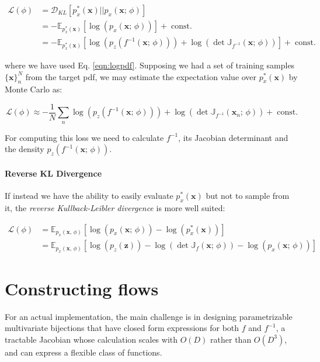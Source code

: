 \[
\begin{aligned}
    \mathcal{L}(\phi) &= \mathcal{D}_{KL}[p_x^*(\mathbf{x})||p_x(\mathbf{x}; \, \phi)]\\
    &= -\mathbb{E}_{p_x^*(\mathbf{x})}[\log(p_x(\mathbf{x}; \, \phi))] +\; \text{const.}\\
    &= -\mathbb{E}_{p_x^*(\mathbf{x})}[\log(p_z(f^{-1}(\mathbf{x}; \, \phi)))+\log\left(\det\mathbb{J}_{f^{-1}}(\mathbf{x}; \, \phi)\right)] +\; \text{const.}
\end{aligned}
\]

where we have used Eq. \ref{eqn:logpdf}. Supposing we had a set of training samples $\{\mathbf{x}\}^N_n$ from the target pdf, we may estimate the expectation value over $p_x^*(\mathbf{x})$ by Monte Carlo as:

\[
\mathcal{L}(\phi) \approx -\frac{1}{N} \sum_n \log(p_z(f^{-1}(\mathbf{x}; \, \phi)))+\log\left(\det\mathbb{J}_{f^{-1}}(\mathbf{x}_n; \, \phi)\right) +\; \text{const.}
\]

For computing this loss we need to calculate $f^{-1}$, its Jacobian determinant and the density $p_z(f^{-1}(\mathbf{x}; \, \phi))$. 

\paragraph{Reverse KL Divergence} If instead we have the ability to easily evaluate $p_x^*(\mathbf{x})$ but not to sample from it, the \emph{reverse Kullback-Leibler divergence} is more well suited:

\[
\begin{aligned}
    \mathcal{L}(\phi) &= \mathbb{E}_{p_x(\mathbf{x}, \, \phi)}[\log(p_x(\mathbf{x}; \, \phi)) - \log(p_x^*(\mathbf{x}))]\\
    &= \mathbb{E}_{p_x(\mathbf{x}, \, \phi)}[\log(p_z(\mathbf{z}))-\log\left(\det\mathbb{J}_{f}(\mathbf{x}; \, \phi)\right)-\log(p_x(\mathbf{x}; \, \phi))]
\end{aligned}
\]

\section{Constructing flows}
For an actual implementation, the main challenge is in designing parametrizable multivariate bijections that have closed form expressions for both $f$ and $f^{-1}$, a tractable Jacobian whose calculation scales with $O(D)$ rather than $O(D^3)$, and can express a flexible class of functions.

